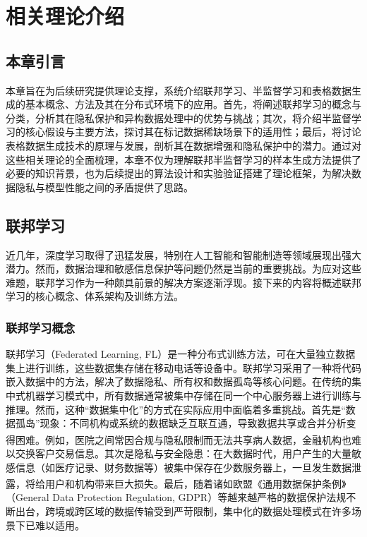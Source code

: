 \chapter{相关理论介绍}
\thispagestyle{others}
\pagestyle{others}
\xiaosi

\section{本章引言}
本章旨在为后续研究提供理论支撑，系统介绍联邦学习、半监督学习和表格数据生成的基本概念、方法及其在分布式环境下的应用。首先，将阐述联邦学习的概念与分类，分析其在隐私保护和异构数据处理中的优势与挑战；其次，将介绍半监督学习的核心假设与主要方法，探讨其在标记数据稀缺场景下的适用性；最后，将讨论表格数据生成技术的原理与发展，剖析其在数据增强和隐私保护中的潜力。通过对这些相关理论的全面梳理，本章不仅为理解联邦半监督学习的样本生成方法提供了必要的知识背景，也为后续提出的算法设计和实验验证搭建了理论框架，为解决数据隐私与模型性能之间的矛盾提供了思路。

\section{联邦学习}
近几年，深度学习取得了迅猛发展，特别在人工智能和智能制造等领域展现出强大潜力。然而，数据治理和敏感信息保护等问题仍然是当前的重要挑战。为应对这些难题，联邦学习作为一种颇具前景的解决方案逐渐浮现。接下来的内容将概述联邦学习的核心概念、体系架构及训练方法。

\subsection{联邦学习概念}
联邦学习（Federated Learning, FL）是一种分布式训练方法，可在大量独立数据集上进行训练，这些数据集存储在移动电话等设备中。联邦学习采用了一种将代码嵌入数据中的方法，解决了数据隐私、所有权和数据孤岛等核心问题。在传统的集中式机器学习模式中，所有数据通常被集中存储在同一个中心服务器上进行训练与推理。然而，这种“数据集中化”的方式在实际应用中面临着多重挑战。首先是“数据孤岛”现象：不同机构或系统的数据缺乏互联互通，导致数据共享或合并分析变得困难\textsuperscript{\cite{yang2019federated}}。例如，医院之间常因合规与隐私限制而无法共享病人数据，金融机构也难以交换客户交易信息。其次是隐私与安全隐患：在大数据时代，用户产生的大量敏感信息（如医疗记录、财务数据等）被集中保存在少数服务器上，一旦发生数据泄露，将给用户和机构带来巨大损失\textsuperscript{\cite{mcmahan2017communication}}。最后，随着诸如欧盟《通用数据保护条例》（General Data Protection Regulation, GDPR）等越来越严格的数据保护法规不断出台，跨境或跨区域的数据传输受到严苛限制，集中化的数据处理模式在许多场景下已难以适用。

